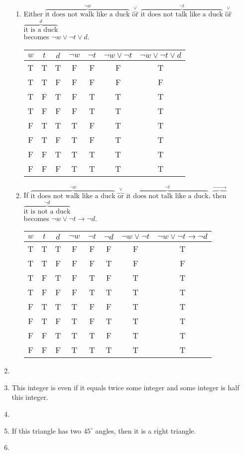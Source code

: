 \documentclass[12pt]{article}
\begin{document}
\begin{enumerate}
\begin{enumerate}
  \item Either $\overbrace{\text{it does not walk like a duck}}^{\neg w}$ $\overbrace{\text{or}}^{\vee}$ $\overbrace{\text{it does not talk like a duck}}^{\neg t}$ $\overbrace{\text{or}}^{\vee}$ $\overbrace{\text{it is a duck}}^{d}$ \\becomes $\neg w \vee \neg t \vee d $.\\[\baselineskip]
\begin{tabular} {|c|c|c||c|c|c|c|}
\hline
$w$ & $t$ & $d$  & $\neg w$ & $\neg t$ & $\neg w \vee \neg t$ & $\neg w \vee \neg t \vee d$\\ \hline
T & T & T & F & F & F & T\\
T & T & F & F & F & F & F\\
T & F & T & F & T & T & T\\
T & F & F & F & T & T & T\\
F & T & T & T & F & T & T\\
F & T & F & T & F & T & T\\
F & F & T & T & T & T & T\\
F & F & F & T & T & T & T\\ \hline
\end{tabular}
  \item If $\overbrace{\text{it does not walk like a duck}}^{\neg w}$ $\overbrace{\text{or}}^{\vee}$ $\overbrace{\text{it does not talk like a duck}}^{\neg t}$, $\overbrace{\text{then}}^{\rightarrow}$ $\overbrace{\text{it is not a duck}}^{\neg d}$\\becomes $\neg w \vee \neg t \rightarrow \neg d$.\\[\baselineskip]
\begin{tabular} {|c|c|c||c|c|c|c|c|}
\hline
$w$ & $t$ & $d$  & $\neg w$ & $\neg t$ & $\neg d$ & $\neg w \vee \neg t$ & $\neg w \vee \neg t \rightarrow \neg d$\\ \hline
T & T & T & F & F & F & F & T\\
T & T & F & F & F & T & F & F\\
T & F & T & F & T & F & T & T\\
T & F & F & F & T & T & T & T\\
F & T & T & T & F & F & T & T\\
F & T & F & T & F & T & T & T\\
F & F & T & T & T & F & T & T\\
F & F & F & T & T & T & T & T\\ \hline
\end{tabular}

  \end{enumerate}

\setcounter{enumi}{20} %
\item
\setcounter{enumi}{32} %
\item This integer is even if it equals twice some integer and some integer is half this integer.
\setcounter{enumi}{34} %
\item
\setcounter{enumi}{40} %
\item If this triangle has two $45^{\circ}$ angles, then it is a right triangle.
\setcounter{enumi}{42} %
\item 
\end{enumerate}
\end{document}
